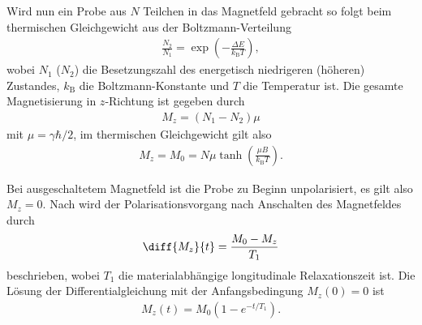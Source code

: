 Wird nun ein Probe aus $N$ Teilchen in das Magnetfeld gebracht so folgt beim thermischen Gleichgewicht aus der Boltzmann-Verteilung
\begin{align*}
  \frac{N_2}{N_1}=\exp \left( -\frac{\Delta E}{k_\mathrm{B}T} \right),
\end{align*}
wobei $N_1$ ($N_2$) die Besetzungszahl des energetisch niedrigeren (höheren) Zustandes, $k_\mathrm{B}$ die Boltzmann-Konstante und $T$ die Temperatur ist. Die gesamte Magnetisierung in $z$-Richtung ist gegeben durch 
\begin{align*}
  M_z=(N_1-N_2)\mu
\end{align*} 
mit $\mu=\gamma\hbar/2$, im thermischen Gleichgewicht gilt also
\begin{align*}
  M_z=M_0=N\mu\tanh \left(  \frac{\mu B}{k_\mathrm{B}T}\right).
\end{align*}

Bei ausgeschaltetem Magnetfeld ist die Probe zu Beginn unpolarisiert, es gilt also $M_z=0$. Nach \cite{manual} wird der Polarisationsvorgang nach Anschalten des Magnetfeldes durch 
\begin{align*}
  \diff{M_z}{t}=\frac{M_0-M_z}{T_1}
\end{align*}
beschrieben, wobei $T_1$ die materialabhängige longitudinale Relaxationszeit ist. Die Lösung der Differentialgleichung mit der Anfangsbedingung $M_z(0)=0$ ist
\begin{align}
  M_z(t)=M_0\left( 1-e^{-t/T_1} \right).
\end{align}

